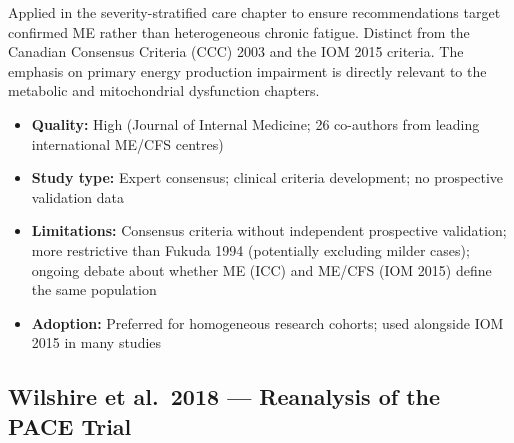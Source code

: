 \begin{description}
\begin{itemize}
    \end{itemize}
    \item[Relevance to ME/CFS:] Applied in the severity-stratified care chapter to ensure recommendations target confirmed ME rather than heterogeneous chronic fatigue. Distinct from the Canadian Consensus Criteria (CCC) 2003 and the IOM 2015 criteria. The emphasis on primary energy production impairment is directly relevant to the metabolic and mitochondrial dysfunction chapters.
    \item[Certainty Assessment:]
    \begin{itemize}
        \item \textbf{Quality:} High (Journal of Internal Medicine; 26 co-authors from leading international ME/CFS centres)
        \item \textbf{Study type:} Expert consensus; clinical criteria development; no prospective validation data
        \item \textbf{Limitations:} Consensus criteria without independent prospective validation; more restrictive than Fukuda 1994 (potentially excluding milder cases); ongoing debate about whether ME (ICC) and ME/CFS (IOM 2015) define the same population
        \item \textbf{Adoption:} Preferred for homogeneous research cohorts; used alongside IOM 2015 in many studies
    \end{itemize}
\end{description}

\subsection{Wilshire et al.\ 2018 --- Reanalysis of the PACE Trial}

